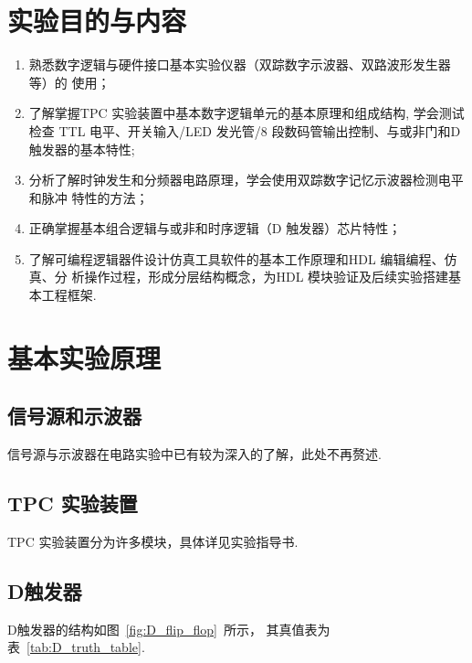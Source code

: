 \documentclass[fontset=windows,11pt]{SEU-Digital-Report}
\begin{document}
    \exptitlepage

    \tableofcontents
    \newpage

    \section{实验目的与内容}
        
        \begin{enumerate}
            \item 熟悉数字逻辑与硬件接口基本实验仪器（双踪数字示波器、双路波形发生器等）的
            使用；
            \item 了解掌握TPC 实验装置中基本数字逻辑单元的基本原理和组成结构, 学会测试检查
            TTL 电平、开关输入/LED 发光管/8 段数码管输出控制、与或非门和D 触发器的基本特性;
            \item 分析了解时钟发生和分频器电路原理，学会使用双踪数字记忆示波器检测电平和脉冲
            特性的方法；
            \item 正确掌握基本组合逻辑与或非和时序逻辑（D 触发器）芯片特性；
            \item 了解可编程逻辑器件设计仿真工具软件的基本工作原理和HDL 编辑编程、仿真、分
            析操作过程，形成分层结构概念，为HDL 模块验证及后续实验搭建基本工程框架.
        \end{enumerate}

    \section{基本实验原理}
        
        \subsection{信号源和示波器}

            信号源与示波器在电路实验中已有较为深入的了解，此处不再赘述.

        \subsection{TPC 实验装置}

            TPC 实验装置分为许多模块，具体详见实验指导书\cite{guide}.

        \subsection{D触发器}

            D触发器的结构如图~\ref{fig:D_flip_flop}~所示，
            其真值表为表~\ref{tab:D_truth_table}.
\end{document}
